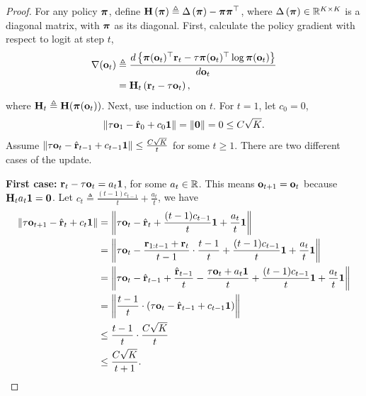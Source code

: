 \begin{proof}
For any policy ${\boldsymbol{\pi}}$, define ${\mathbf{H}}\left( {\boldsymbol{\pi}} \right) \triangleq \Delta \left( {\boldsymbol{\pi}} \right) - {\boldsymbol{\pi}} {\boldsymbol{\pi}}^\top$, where $\Delta \left( {\boldsymbol{\pi}} \right) \in {\mathbb{R}}^{K \times K}$ is a diagonal matrix, with ${\boldsymbol{\pi}}$ as its diagonal. First, calculate the policy gradient with respect to logit at step $t$,
\begin{equation*}
\begin{split}
    \nabla({\mathbf{o}}_t) &\triangleq \frac{d \left\{ {\boldsymbol{\pi}}({\mathbf{o}}_t)^\top {\mathbf{r}}_t - \tau {\boldsymbol{\pi}}({\mathbf{o}}_t)^\top \log{{\boldsymbol{\pi}}({\mathbf{o}}_t)} \right\} }{d {\mathbf{o}}_t} \\
    &= {\mathbf{H}}_t \left( {\mathbf{r}}_t - \tau {\mathbf{o}}_t \right),
\end{split}
\end{equation*}
where ${\mathbf{H}}_t \triangleq {\mathbf{H}}({\boldsymbol{\pi}}({\mathbf{o}}_t))$. Next, use induction on $t$. For $t=1$, let $c_0 = 0$,
\begin{equation*}
\begin{split}
    \left\| \tau {\mathbf{o}}_{1} - \hat{{\mathbf{r}}}_0 + c_0 {\mathbf{1}} \right\| = \left\| {\mathbf{0}} \right\| = 0 \le C \sqrt{K}.
\end{split}
\end{equation*}
Assume $\left\| \tau {\mathbf{o}}_{t} - \hat{{\mathbf{r}}}_{t-1} + c_{t-1} {\mathbf{1}} \right\| \le \frac{C \sqrt{K}}{t}$ for some $t \ge 1$. There  are two different cases of the update.

\textbf{First case:} ${\mathbf{r}}_t - \tau {\mathbf{o}}_t = a_t {\mathbf{1}}$, for some $a_t \in {\mathbb{R}}$. This means ${\mathbf{o}}_{t+1} = {\mathbf{o}}_{t}$ because ${\mathbf{H}}_t a_t {\mathbf{1}} = {\mathbf{0}}$. Let $c_t \triangleq \frac{(t-1)c_{t-1}}{t} +  \frac{a_t}{t}$, we have
\begin{equation*}
\begin{split}
    \left\| \tau {\mathbf{o}}_{t+1} - \hat{{\mathbf{r}}}_t + c_t {\mathbf{1}} \right\| &= \left\| \tau {\mathbf{o}}_{t} - \hat{{\mathbf{r}}}_t + \frac{(t-1)c_{t-1}}{t} {\mathbf{1}} + \frac{a_t}{t} {\mathbf{1}} \right\| \\
    &= \left\| \tau {\mathbf{o}}_{t} - \frac{{\mathbf{r}}_{1:t-1} + {\mathbf{r}}_t}{t-1} \cdot \frac{t-1}{t} + \frac{(t-1)c_{t-1}}{t} {\mathbf{1}} + \frac{a_t}{t} {\mathbf{1}} \right\| \\
    &= \left\| \tau {\mathbf{o}}_{t} - \hat{{\mathbf{r}}}_{t-1} + \frac{\hat{{\mathbf{r}}}_{t-1}}{t} - \frac{\tau {\mathbf{o}}_t + a_t {\mathbf{1}}}{t} + \frac{(t-1)c_{t-1}}{t} {\mathbf{1}} + \frac{a_t}{t} {\mathbf{1}} \right\| \\
    &= \left\| \frac{t-1}{t} \cdot \left( \tau {\mathbf{o}}_{t} - \hat{{\mathbf{r}}}_{t-1} + c_{t-1} {\mathbf{1}} \right) \right\| \\
    &\le \frac{t-1}{t} \cdot \frac{C \sqrt{K}}{t} \\
    &\le \frac{C \sqrt{K}}{t+1}.
\end{split}
\end{equation*}


\end{proof}
